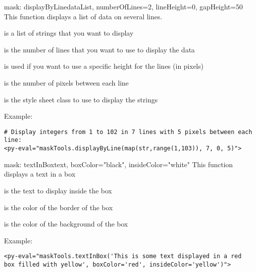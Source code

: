 \begin{funcdesc}{mask: displayByLine}{dataList, numberOfLines=2, lineHeight=0, gapHeight=50}
This function displays a list of data on several lines.

 is a list of strings that you want to display

 is the number of lines that you want to use to display the data

 is used if you want to use a specific height for the lines (in pixels)

 is the number of pixels between each line

 is the style sheet class to use to display the strings

Example:
\begin{verbatim}
# Display integers from 1 to 102 in 7 lines with 5 pixels between each line:
<py-eval="maskTools.displayByLine(map(str,range(1,103)), 7, 0, 5)">
\end{verbatim}
\end{funcdesc}

\begin{funcdesc}{mask: textInBox}{text, boxColor="black", insideColor="white"}
This function displays a text in a box

 is the text to display inside the box

 is the color of the border of the box

 is the color of the background of the box

Example:
\begin{verbatim}
<py-eval="maskTools.textInBox('This is some text displayed in a red box filled with yellow', boxColor='red', insideColor='yellow')">
\end{verbatim}
\end{funcdesc}


